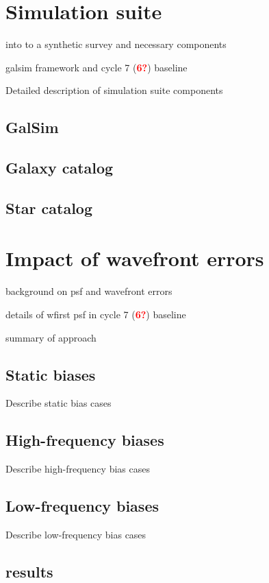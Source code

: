 \documentclass[aps,prd, amsmath,amssymb,superscriptaddress,showkeys,nofootinbib,reprint,preprintnumbers]{revtex4-1}
\newcommand{\verify}[1]{\textcolor{red}{\textbf{{#1}}}}
\begin{document}
\section{Simulation suite}\label{sec:sim}

into to a synthetic survey and necessary components

galsim framework and cycle 7 (\verify{6?}) baseline

Detailed description of simulation suite components

\subsection{GalSim}
\subsection{Galaxy catalog}
\subsection{Star catalog}

\section{Impact of wavefront errors}\label{sec:results}

background on psf and wavefront errors

details of wfirst psf in cycle 7 (\verify{6?}) baseline

summary of approach 

\subsection{Static biases}\label{sec:static}

Describe static bias cases

\subsection{High-frequency biases}\label{sec:low}

Describe high-frequency bias cases

\subsection{Low-frequency biases}\label{sec:high}

Describe low-frequency bias cases

\subsection{results}\label{sec:results}
\end{document}
